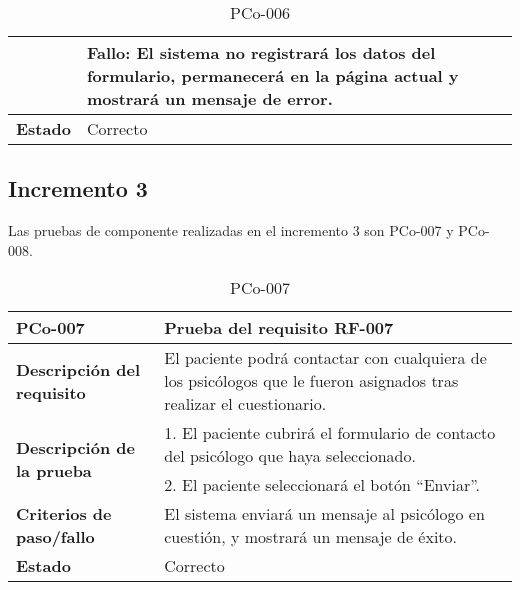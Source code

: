 \begin{table}[htpb]
\begin{tabularx}{\textwidth}{|l|X|}
                                                   & Fallo: El sistema no registrará los datos del formulario, permanecerá en la página actual y mostrará un mensaje de error.\\ \hline
\textbf{Estado}                                    & Correcto                                                                                                                                                                                                                                                                                                                                 \\ \hline
\end{tabularx}
\caption{PCo-006}
\end{table}


\subsection{Incremento 3}

Las pruebas de componente realizadas en el incremento 3 son PCo-007 y PCo-008.

\begin{table}[htpb]
\centering
\begin{tabularx}{\textwidth}{|l|X|}
\hline
\textbf{PCo-007}                                     & \textbf{Prueba del requisito RF-007}                                                                                \\ \hline
\textbf{Descripción del requisito}                 & El paciente podrá contactar con cualquiera de los psicólogos que le fueron asignados tras realizar el cuestionario. \\ \hline
\multirow{2}{*}{\textbf{Descripción de la prueba}} & 1. El paciente cubrirá el formulario de contacto del psicólogo que haya seleccionado.                               \\ \cline{2-2} 
                                                   & 2. El paciente seleccionará el botón ``Enviar''.
\\ \hline
\textbf{Criterios de paso/fallo}                   & El sistema enviará un mensaje al psicólogo en cuestión, y mostrará un mensaje de éxito.                             \\ \hline
\textbf{Estado}                                    & Correcto                                                                                                            \\ \hline
\end{tabularx}
\caption{PCo-007}
\end{table}


